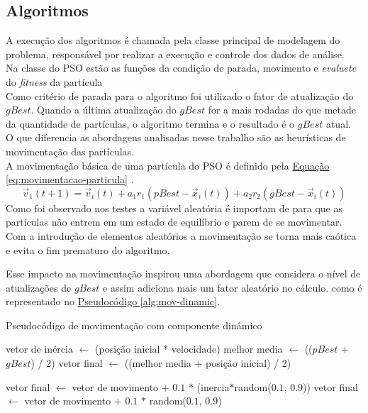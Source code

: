 \subsection{Algoritmos}
A execução dos algoritmos é chamada pela classe principal de modelagem do problema, responsável por realizar a execução e controle dos dados de análise.\\
%
Na classe do PSO estão as funções da condição de parada, movimento e \textit{evaluete} do \textit{fitness} da partícula\\
%
%
Como critério de parada para o algoritmo foi utilizado o fator de atualização do $gBest$. Quando a última atualização do $gBest$ for a mais rodadas do que metade da quantidade de partículas, o algoritmo termina e o resultado é o $gBest$ atual.\\
\indent O que diferencia as abordagens analisadas nesse trabalho são as heurísticas de movimentação das partículas.\\
A movimentação básica de uma partícula do PSO é definido pela
\hyperref[eq:movimentacao-particula]{Equação \ref{eq:movimentacao-particula}}
.
%
\begin{equation} 
    \label{eq:movimentacao-particula}
    \vec v_1(t+1)= \vec v_i(t) + a_1 r_1 (pBest - \vec x_i(t)) + a_2 r_2 (gBest - \vec x_i(t))
\end{equation}
%
Como foi observado nos testes a variável aleatória é importam de para que as partículas não entrem em um estado de equilíbrio e parem de se movimentar. Com a introdução de elementos aleatórios a movimentação se torna mais caótica e evita o fim prematuro do algoritmo.

Esse impacto na movimentação inspirou uma abordagem que considera o nível de atualizações de $gBest$ e assim adiciona mais um fator aleatório no cálculo. como é representado no 
\hyperref[alg:mov-dinamic]{Pseudocódigo \ref{alg:mov-dinamic}}.
\begin{algorithm}
    \caption{Pseudocódigo de movimentação com componente dinâmico}\label{alg:mov-dinamic}
\begin{algorithmic}

\State vetor de inércia $\gets$ (posição inicial * velocidade)
\State melhor media $\gets$ (($pBest$ + $gBest$) / 2)
\State vetor final $\gets$ ((melhor media + posição inicial) / 2)

    \State vetor final $\gets$ vetor de movimento $+$ $0.1$ $*$ (inercia$*$random($0.1$, $0.9$))
\Else
    \State vetor final $\gets$ vetor de movimento $+$ $0.1$ $*$ random($0.1$, $0.9$) 
\EndIf    
\end{algorithmic}
\end{algorithm}

